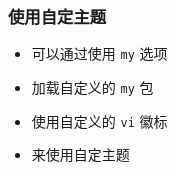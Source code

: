 \documentclass{ctexbeamer}
\begin{document}
\begin{frame}
  \frametitle{使用自定主题}
  \begin{itemize}
    \item 可以通过使用 \texttt{my} 选项
    \item 加载自定义的 \texttt{my} 包
    \item 使用自定义的 \texttt{vi} 徽标
    \item 来使用自定主题
  \end{itemize}
\end{frame}
\end{document}
